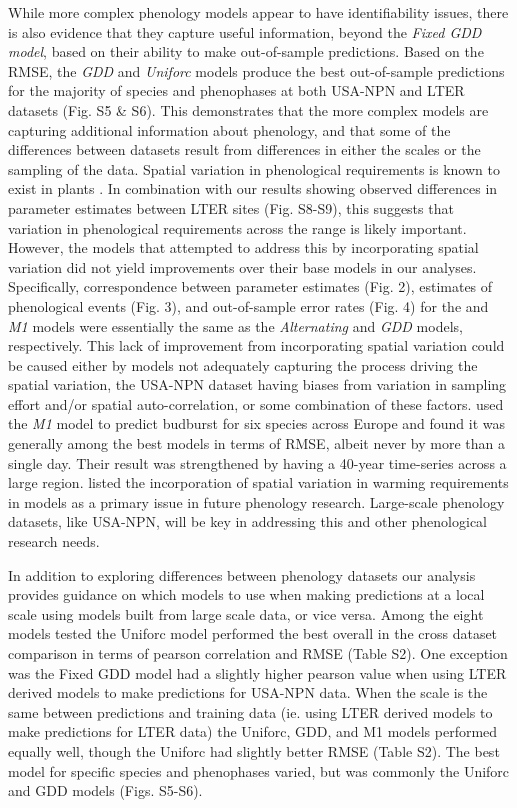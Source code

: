 \documentclass[fleqn,12pt,lineno]{article}
\begin{document}
While more complex phenology models appear to have identifiability issues, there is also evidence that they capture useful information, beyond the \textit{Fixed GDD model}, based on their ability to make out-of-sample predictions. Based on the RMSE, the \textit{GDD} and \textit{Uniforc} models produce the best out-of-sample predictions for the majority of species and phenophases at both USA-NPN and LTER datasets (Fig. S5 \& S6). This demonstrates that the more complex models are capturing additional information about phenology, and that some of the differences between datasets result from differences in either the scales or the sampling of the data. Spatial variation in phenological requirements is known to exist in plants \citep{zhang2017}. In combination with our results showing observed differences in parameter estimates between LTER sites (Fig. S8-S9), this suggests that variation in phenological requirements across the range is likely important. However, the models that attempted to address this by incorporating spatial variation did not yield improvements over their base models in our analyses. Specifically, correspondence between parameter estimates (Fig. 2), estimates of phenological events (Fig. 3), and out-of-sample error rates (Fig. 4) for the  and \textit{M1} models were essentially the same as the \textit{Alternating} and \textit{GDD} models, respectively. This lack of improvement from incorporating spatial variation could be caused either by models not adequately capturing the process driving the spatial variation, the USA-NPN dataset having biases from variation in sampling effort and/or spatial auto-correlation, or some combination of these factors. \cite{basler2016} used the \textit{M1} model to predict budburst for six species across Europe and found it was generally among the best models in terms of RMSE, albeit never by more than a single day. Their result was strengthened by having a 40-year time-series across a large region. \cite{chuine2017} listed the incorporation of spatial variation in warming requirements in models as a primary issue in future phenology research. Large-scale phenology datasets, like USA-NPN, will be key in addressing this and other phenological research needs.

In addition to exploring differences between phenology datasets our analysis provides guidance on which models to use when making predictions at a local scale using models built from large scale data, or vice versa. Among the eight models tested the Uniforc model performed the best overall in the cross dataset comparison in terms of pearson correlation and RMSE (Table S2). One exception was the Fixed GDD model had a slightly higher pearson value when using LTER derived models to make predictions for USA-NPN data. When the scale is the same between predictions and training data (ie. using LTER derived models to make predictions for LTER data) the Uniforc, GDD, and M1 models performed equally well, though the Uniforc had slightly better RMSE (Table S2). The best model for specific species and phenophases varied, but was commonly the Uniforc and GDD models (Figs. S5-S6). 
\end{document}
